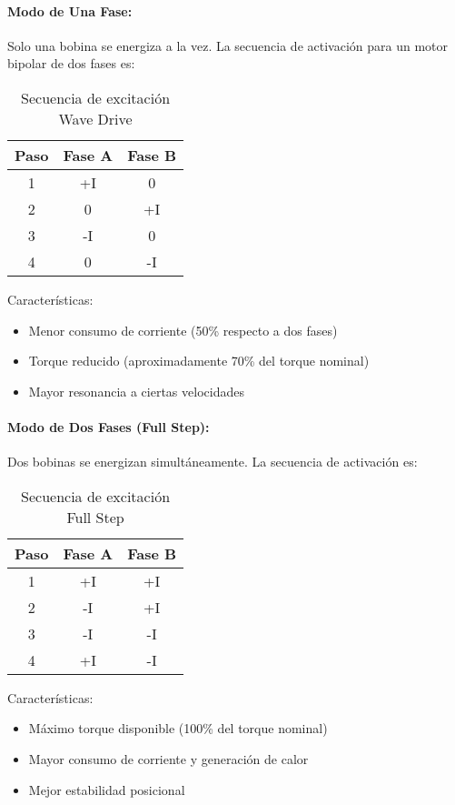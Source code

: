 \paragraph{Modo de Una Fase:}

Solo una bobina se energiza a la vez. La secuencia de activación para un motor bipolar de dos fases es:

\begin{table}[ht]
\centering
\caption{Secuencia de excitación Wave Drive}
\begin{tabular}{|c|c|c|}
\hline
\textbf{Paso} & \textbf{Fase A} & \textbf{Fase B} \\
\hline
1 & +I & 0 \\
2 & 0 & +I \\
3 & -I & 0 \\
4 & 0 & -I \\
\hline
\end{tabular}
\end{table}

Características:
\begin{itemize}
    \item Menor consumo de corriente (50\% respecto a dos fases)
    \item Torque reducido (aproximadamente 70\% del torque nominal)
    \item Mayor resonancia a ciertas velocidades
\end{itemize}

\paragraph{Modo de Dos Fases (Full Step):}

Dos bobinas se energizan simultáneamente. La secuencia de activación es:

\begin{table}[ht]
\centering
\caption{Secuencia de excitación Full Step}
\begin{tabular}{|c|c|c|}
\hline
\textbf{Paso} & \textbf{Fase A} & \textbf{Fase B} \\
\hline
1 & +I & +I \\
2 & -I & +I \\
3 & -I & -I \\
4 & +I & -I \\
\hline
\end{tabular}
\end{table}

Características:
\begin{itemize}
    \item Máximo torque disponible (100\% del torque nominal)
    \item Mayor consumo de corriente y generación de calor
    \item Mejor estabilidad posicional
\end{itemize}

